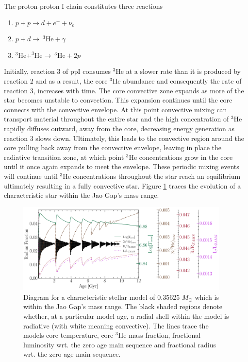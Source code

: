 The proton-proton I chain constitutes three reactions 
\begin{enumerate} 
	\item $p + p \longrightarrow d + e^{+} + \nu_{e}$
	\item $p + d \longrightarrow \ ^{3}\text{He} + \gamma$
	\item $^{3}\text{He} + ^{3}\text{He} \longrightarrow \ ^{3}\text{He} + 2p$ 
\end{enumerate} 
Initially, reaction 3 of ppI consumes $^{3}$He at a slower rate than it is
produced by reaction 2 and as a result, the core $^{3}$He abundance and
consequently the rate of reaction 3, increases with time. The core convective
zone expands as more of the star becomes unstable to convection. This expansion
continues until the core connects with the convective envelope. At this point
convective mixing can transport material throughout the entire star and the
high concentration of $^{3}$He rapidly diffuses outward, away from the core,
decreasing energy generation as reaction 3 slows down. Ultimately, this leads
to the convective region around the core pulling back away from the convective
envelope, leaving in place the radiative transition zone, at which point
$^{3}$He concentrations grow in the core until it once again expands to meet
the envelope.  These periodic mixing events will continue until $^{3}$He
concentrations throughout the star reach an equilibrium ultimately resulting in
a fully convective star. Figure \ref{fig:Kippenhan1} traces the evolution of a
characteristic star within the Jao Gap's mass range.

\begin{figure}
	\centering
	\includegraphics[width=0.95\textwidth]{Kippenhan.pdf}
	\caption{Diagram for a characteristic stellar model of 0.35625 $M_{\odot}$
	which is within the Jao Gap's mass range. The black shaded regions denote
	whether, at a particular model age, a radial shell within the model is
	radiative (with white meaning convective). The lines trace the models core
	temperature, core $^{3}$He mass fraction, fractional luminosity wrt. the
	zero age main sequence and fractional radius wrt. the zero age main
	sequence.}
	\label{fig:Kippenhan1}
\end{figure}



